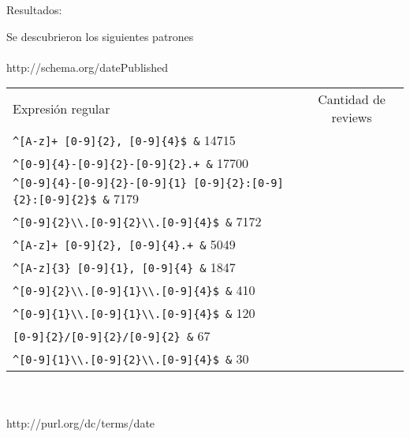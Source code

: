 Resultados:

Se descubrieron los siguientes patrones
\\
\\
http://schema.org/datePublished\\
\begin{tabular}{| l | c |}
Expresión regular & Cantidad de reviews\\
\verb|^[A-z]+ [0-9]{2}, [0-9]{4}$ &| 14715 \\
\verb|^[0-9]{4}-[0-9]{2}-[0-9]{2}.+ &| 17700 \\
\verb|^[0-9]{4}-[0-9]{2}-[0-9]{1} [0-9]{2}:[0-9]{2}:[0-9]{2}$ &| 7179 \\
\verb|^[0-9]{2}\\.[0-9]{2}\\.[0-9]{4}$ &| 7172\\
\verb|^[A-z]+ [0-9]{2}, [0-9]{4}.+ &| 5049\\
\verb|^[A-z]{3} [0-9]{1}, [0-9]{4} &| 1847\\
\verb|^[0-9]{2}\\.[0-9]{1}\\.[0-9]{4}$ &| 410\\
\verb|^[0-9]{1}\\.[0-9]{1}\\.[0-9]{4}$ &| 120\\
\verb|[0-9]{2}/[0-9]{2}/[0-9]{2} &| 67\\
\verb|^[0-9]{1}\\.[0-9]{2}\\.[0-9]{4}$ &| 30
\end{tabular}
\\
\\
http://purl.org/dc/terms/date\\

